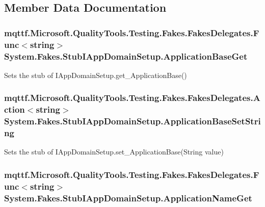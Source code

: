 \subsection{Member Data Documentation}
\hypertarget{class_system_1_1_fakes_1_1_stub_i_app_domain_setup_aaf566af49f571ef87683f66907a56af5}{
\subsubsection[{Application\-Base\-Get}]{\setlength{\rightskip}{0pt plus 5cm}mqttf.\-Microsoft.\-Quality\-Tools.\-Testing.\-Fakes.\-Fakes\-Delegates.\-Func$<$string$>$ System.\-Fakes.\-Stub\-I\-App\-Domain\-Setup.\-Application\-Base\-Get}}\label{class_system_1_1_fakes_1_1_stub_i_app_domain_setup_aaf566af49f571ef87683f66907a56af5}


Sets the stub of I\-App\-Domain\-Setup.\-get\-\_\-\-Application\-Base()

\hypertarget{class_system_1_1_fakes_1_1_stub_i_app_domain_setup_a683fd866f2f4ba294bf9bed3dda73b32}{
\subsubsection[{Application\-Base\-Set\-String}]{\setlength{\rightskip}{0pt plus 5cm}mqttf.\-Microsoft.\-Quality\-Tools.\-Testing.\-Fakes.\-Fakes\-Delegates.\-Action$<$string$>$ System.\-Fakes.\-Stub\-I\-App\-Domain\-Setup.\-Application\-Base\-Set\-String}}\label{class_system_1_1_fakes_1_1_stub_i_app_domain_setup_a683fd866f2f4ba294bf9bed3dda73b32}


Sets the stub of I\-App\-Domain\-Setup.\-set\-\_\-\-Application\-Base(\-String value)

\hypertarget{class_system_1_1_fakes_1_1_stub_i_app_domain_setup_a0fcc4a08b942630200ad62e3ead492e6}{
\subsubsection[{Application\-Name\-Get}]{\setlength{\rightskip}{0pt plus 5cm}mqttf.\-Microsoft.\-Quality\-Tools.\-Testing.\-Fakes.\-Fakes\-Delegates.\-Func$<$string$>$ System.\-Fakes.\-Stub\-I\-App\-Domain\-Setup.\-Application\-Name\-Get}}\label{class_system_1_1_fakes_1_1_stub_i_app_domain_setup_a0fcc4a08b942630200ad62e3ead492e6}


